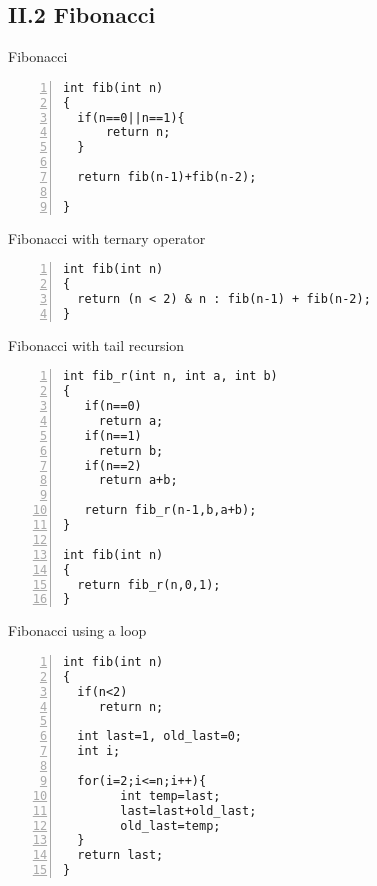 \documentclass{beamer}
\begin{document}
\subsection*{II.2 Fibonacci}
\begin{frame}[fragile]{Fibonacci}
\begin{lstlisting}[numbers=left]
int fib(int n)
{
  if(n==0||n==1){
      return n;
  }

  return fib(n-1)+fib(n-2);

}
\end{lstlisting}
\end{frame}

\begin{frame}[fragile]{Fibonacci with ternary operator}
\begin{lstlisting}[numbers=left]
int fib(int n)
{
  return (n < 2) & n : fib(n-1) + fib(n-2); 
}
\end{lstlisting}
\end{frame}



\begin{frame}[fragile]{Fibonacci with tail recursion}
\begin{lstlisting}[numbers=left]
int fib_r(int n, int a, int b)
{
   if(n==0)
     return a;
   if(n==1)
     return b;
   if(n==2)
     return a+b;

   return fib_r(n-1,b,a+b);
}

int fib(int n)
{
  return fib_r(n,0,1);
}
\end{lstlisting}
\end{frame}



\begin{frame}[fragile]{Fibonacci using a loop}
\begin{lstlisting}[numbers=left]
int fib(int n)
{
  if(n<2)
     return n;
  
  int last=1, old_last=0;
  int i;

  for(i=2;i<=n;i++){
        int temp=last;
        last=last+old_last;
        old_last=temp;
  }
  return last;
}
\end{lstlisting}
\end{frame}
\end{document}
